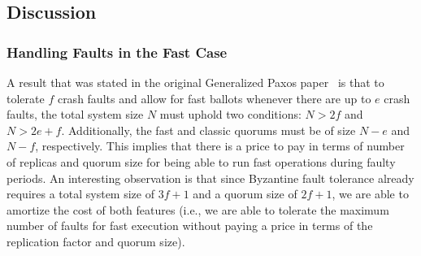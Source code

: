 \subsection{Discussion}

\subsubsection{Handling Faults in the Fast Case}
A result that was stated in the original Generalized Paxos paper~\cite{Lamport2005} is that to tolerate $f$ crash faults and allow for fast ballots whenever there are up to $e$ crash faults, the total system size $N$ must uphold two conditions: $N > 2f$ and $N > 2e+f$. Additionally, the fast and classic quorums must be of size $N-e$ and $N-f$, respectively. This implies that there is a price to pay in terms of number of replicas and quorum size for being able to run fast operations during faulty periods. An interesting observation is that since Byzantine fault tolerance already requires a total system size of $3f+1$ and a quorum size of $2f+1$, we are able to amortize the cost of both features (i.e., we are able to tolerate the maximum number of faults for fast execution without paying a price in terms of the replication factor and quorum size).

